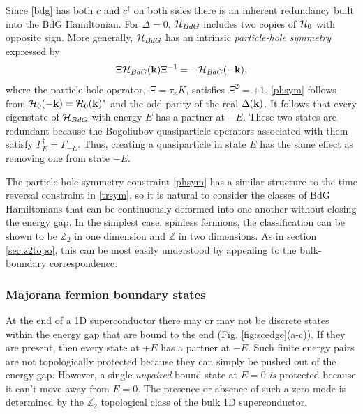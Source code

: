 \documentclass[twocolumn,floatfix,showpacs,rmp,aps]{revtex4}
\begin{document}
Since \eqref{bdg} has both $c$ and $c^\dagger$ on both sides there is
an inherent redundancy built into the BdG Hamiltonian.  For
$\Delta=0$, ${\cal H}_{BdG}$ includes
two copies of ${\cal H}_0$ with opposite sign.  More generally, ${\cal H}_{BdG}$
has an intrinsic {\it particle-hole symmetry} expressed by
\begin{equation}
\Xi {\cal H}_{BdG}({\bf k}) \Xi^{-1} = - {\cal H}_{BdG}(-{\bf k}),
\label{phsym}
\end{equation}
where the particle-hole operator, $\Xi = \tau_x K$,
satisfies $\Xi^2 = +1$.  \eqref{phsym} follows from ${\cal H}_0(-{\bf k})={\cal H}_0({\bf k})^*$
and the odd parity of the real $\Delta({\bf k})$.  It follows that every
eigenstate of ${\cal H}_{BdG}$ with energy $E$ has a partner at
$-E$.  These two states are redundant because the
Bogoliubov quasiparticle operators associated with them satisfy
$\Gamma_E^\dagger = \Gamma_{-E}$.  Thus, creating a quasiparticle in state
$E$ has the same effect as removing one from state $-E$.

The particle-hole symmetry constraint \eqref{phsym} has a similar
structure to the time reversal constraint in \eqref{trsym}, so it is
natural to consider the classes of BdG Hamiltonians that
can be continuously deformed into one another without closing the
energy gap.  In the simplest case, spinless fermions, the classification
can be shown to be $\mathbb{Z}_2$
in one dimension and $\mathbb{Z}$ in two dimensions.
As in section \ref{sec:z2topo}, this can be most easily understood by appealing to
the bulk-boundary correspondence.

\subsubsection{Majorana fermion boundary states}
\label{sec:majoranaedge}

At the end of a 1D superconductor \cite{kitaev00} there may or may not
be discrete states within the energy gap that are bound to the end
(Fig. \ref{fig:scedge}(a-c)).
If they are present, then every state at $+E$ has a partner at
$-E$.  Such finite energy pairs are not topologically protected
because they can simply be pushed out of the energy gap.  However,
a single {\it unpaired} bound state at $E=0$ {\it is} protected because it can't move away
from $E=0$.  The presence or absence of such a zero mode is determined by the
$\mathbb{Z}_2$ topological class of the bulk 1D superconductor.
\end{document}
